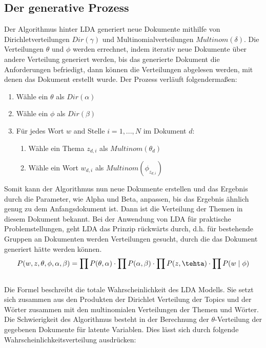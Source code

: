 \documentclass[german,version-2020-11]{uzl-thesis}
\begin{document}
\subsection{Der generative Prozess} 
Der Algorithmus hinter LDA generiert neue Dokumente mithilfe von Dirichletverteilungen $Dir(\gamma)$ und Multinomialverteilungen $Multinom(\delta)$. Die Verteilungen $\theta$ und $\phi$ werden errechnet, indem iterativ neue Dokumente über andere Verteilung generiert werden, bis das generierte Dokument die Anforderungen befriedigt, dann können die Verteilungen abgelesen werden, mit denen das Dokument erstellt wurde. Der Prozess verläuft folgendermaßen: 
\begin{enumerate}
	\item Wähle ein $\theta$ als $Dir(\alpha)$
	\item Wähle ein $\phi$ als $Dir(\beta)$
	\item Für jedes Wort $w$ and Stelle $i = 1,...,N$ im Dokument $d$: 
	\begin{enumerate}
		\item Wähle ein Thema $z_{d,i}$ als $Multinom(\theta_d)$
		\item Wähle ein Wort $w_{d,i}$ als $Multinom(\phi_z_{d,i})$
	\end{enumerate}
\end{enumerate}

Somit kann der Algorithmus nun neue Dokumente erstellen und das Ergebnis durch die Parameter, wie Alpha und Beta, anpassen, bis das Ergebnis ähnlich genug zu dem Anfangsdokument ist. Dann ist die Verteilung der Themen in diesem Dokument bekannt. Bei der Anwendung von LDA für praktische Problemstellungen, geht LDA das Prinzip rückwärts durch, d.h. für bestehende Gruppen an Dokumenten werden Verteilungen gesucht, durch die das Dokument generiert hätte werden können. \\

\begin{equation}
P(w,z,\theta, \phi, \alpha, \beta) = \prod P(\theta, \alpha) \cdot \prod P(\alpha, \beta) \cdot \prod P(z,\tehta) \cdot \prod P(w \mid \phi) 
\end{equation}
\\
Die Formel beschreibt die totale Wahrscheinlichkeit des LDA Modells. Sie setzt sich zusammen aus den Produkten der Dirichlet Verteilung der Topics und der Wörter zusammen mit den multinomialen Verteilungen der Themen und Wörter. Die Schwierigkeit des Algorithmus besteht in der Berechnung der $\theta$-Verteilung der gegebenen Dokumente für latente Variablen. Dies lässt sich durch folgende Wahrscheinlichkeitsverteilung ausdrücken: 
\end{document}
